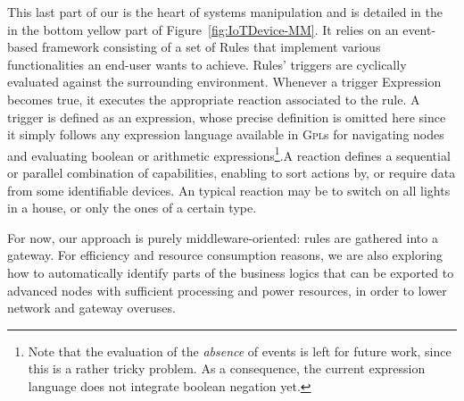 This last part of our \DSL is the heart of \IOT systems manipulation and is detailed in the in the bottom yellow part of Figure~\ref{fig:IoTDevice-MM}. It relies on an event-based framework consisting of a set of \textsf{Rule}s that implement various functionalities an end-user wants to achieve. Rules' \textsf{trigger}s are cyclically evaluated against the surrounding environment. Whenever a \textsf{trigger} \textsf{Expression} becomes true, it executes the appropriate \textsf{reaction} associated to the rule. A \textsf{trigger} is defined as an expression, whose precise definition is omitted here since it simply follows any expression language available in \textsc{Gpl}s for navigating nodes and evaluating boolean or arithmetic expressions\footnote{Note that the evaluation of the \emph{absence} of events is left for future work, since this is a rather tricky problem. As a consequence, the current expression language does not integrate boolean negation yet.}.A \textsf{reaction} defines a sequential or parallel combination of capabilities, enabling to sort actions by, or require data from some identifiable devices. An typical \textsf{reaction} may be to switch on all lights in a house, or only the ones of a certain type.

For now, our approach is purely middleware-oriented: rules are gathered into a gateway. For efficiency and resource consumption reasons, we are also exploring how to automatically identify parts of the business logics that can be exported to advanced nodes with sufficient processing and power resources, in order to lower network and gateway overuses.

